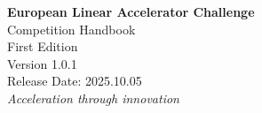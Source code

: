 
\begin{titlepage}
    \centering
    \vspace*{2cm}
    {\Huge\bfseries European Linear Accelerator Challenge\\[0.5cm]}
    {\LARGE Competition Handbook\\[2cm]}
    {\Large First Edition\\[2cm]}
    {\Large Version 1.0.1\\[0.5cm]}
    {\large Release Date: 2025.10.05\\[2cm]}
    \vfill
    {\large\textit{Acceleration through innovation}}\\[0.5cm]
    
\end{titlepage}